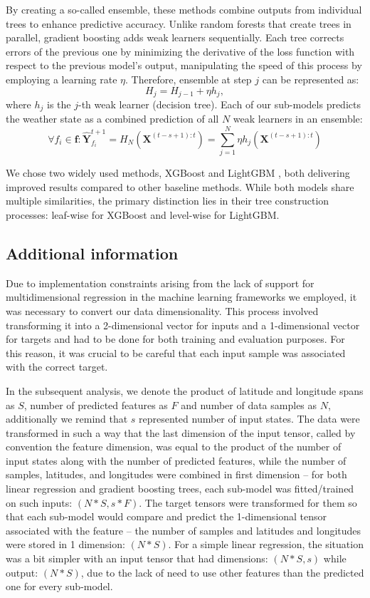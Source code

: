 By creating a so-called ensemble, these methods combine outputs from individual trees to enhance predictive accuracy. Unlike random forests that create trees in parallel, gradient boosting adds weak learners sequentially. Each tree corrects errors of the previous one by minimizing the derivative of the loss function with respect to the previous model's output, manipulating the speed of this process by employing a learning rate $\eta$. Therefore, ensemble at step $j$ can be represented as:
\[
  H_j = H_{j-1} + \eta h_j,
\]
where $h_j$ is the $j$-th weak learner (decision tree).
Each of our sub-models predicts the weather state as a combined prediction of all $N$ weak learners in an ensemble:
\[
     \forall f_i \in \mathbf{f}: \hat{\mathbf{Y}}^{t+1}_{f_i} = H_N\left(\mathbf{X}^{(t-s+1):t}\right) = \sum_{j=1}^{N}\eta h_j\left(\mathbf{X}^{(t-s+1):t}\right)
\]

We chose two widely used methods, XGBoost \cite{Chen_2016} and LightGBM \cite{ke2017lightgbm}, both delivering improved results compared to other baseline methods. While both models share multiple similarities, the primary distinction lies in their tree construction processes: leaf-wise for XGBoost and level-wise for LightGBM.

\subsection{Additional information}
Due to implementation constraints arising from the lack of support for multidimensional regression in the machine learning frameworks we employed, it was necessary to convert our data dimensionality. This process involved transforming it into a 2-dimensional vector for inputs and a 1-dimensional vector for targets and had to be done for both training and evaluation purposes. For this reason, it was crucial to be careful that each input sample was associated with the correct target. 

In the subsequent analysis, we denote the product of latitude and longitude spans as $S$, number of predicted features as $F$ and number of data samples as $N$, additionally we remind that $s$ represented number of input states. The data were transformed in such a way that the last dimension of the input tensor, called by convention the feature dimension, was equal to the product of the number of input states along with the number of predicted features, while the number of samples, latitudes, and longitudes were combined in first dimension -- for both linear regression and gradient boosting trees, each sub-model was fitted/trained on such inputs: $(N*S,s*F)$. The target tensors were transformed for them so that each sub-model would compare and predict the 1-dimensional tensor associated with the feature -- the number of samples and latitudes and longitudes were stored in 1 dimension: $(N*S)$. 
For a simple linear regression, the situation was a bit simpler with an input tensor that had dimensions: $(N*S, s)$ while output: $(N*S)$, due to the lack of need to use other features than the predicted one for every sub-model.

